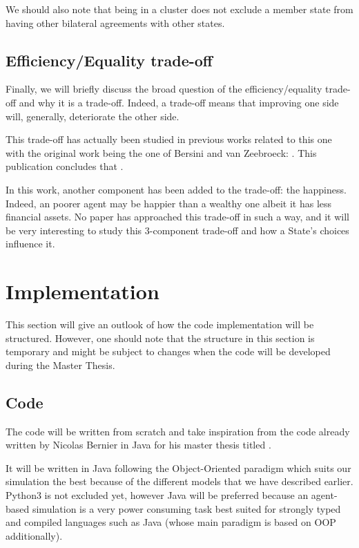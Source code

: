 \documentclass[20pt]{article}
\begin{document}
    We should also note that being in a cluster does not exclude a member state from having other bilateral agreements with other states.

\subsection{Efficiency/Equality trade-off}
    Finally, we will briefly discuss the broad question of the efficiency/equality trade-off and why it is a trade-off. Indeed, a trade-off means that improving one side will, generally, deteriorate the other side.
    
    This trade-off has actually been studied in previous works related to this one with the original work being the one of Bersini and van Zeebroeck: . This publication concludes that  \cite{bersini}.
    
    In this work, another component has been added to the trade-off: the happiness. Indeed, an poorer agent may be happier than a wealthy one albeit it has less financial assets. No paper has approached this trade-off in such a way, and it will be very interesting to study this 3-component trade-off and how a State's choices influence it.


\section{Implementation}\label{section:implementation}

This section will give an outlook of how the code implementation will be structured. However, one should note that the structure in this section is temporary and might be subject to changes when the code will be developed during the Master Thesis.

\subsection{Code}
The code will be written from scratch and take inspiration from the code already written by Nicolas Bernier in Java for his master thesis titled  \cite{nicolasbernier}.

It will be written in Java following the Object-Oriented paradigm which suits our simulation the best because of the different models that we have described earlier. Python3 is not excluded yet, however Java will be preferred because an agent-based simulation is a very power consuming task best suited for strongly typed and compiled languages such as Java (whose main paradigm is based on OOP additionally).
\end{document}
